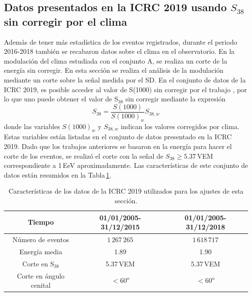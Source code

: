 \subsection{Datos presentados en la ICRC 2019 usando $S_{38}$ sin corregir por el clima} \label{sin_corregir_s38}

Además de tener más estadística de los eventos registrados, durante el periodo 2016-2018 también se recabaron datos sobre el clima en el observatorio. En la modulación del clima estudiada con el conjunto A, se  realiza un corte de la energía sin corregir. En esta sección se realiza el análisis de la modulación mediante un  corte sobre la señal medida por el SD. En el conjunto de datos de la ICRC 2019, es posible acceder al valor de S(1000) sin corregir por el trabajo \cite{aab2017impact}, por lo que uno puede obtener el valor de S$_{38}$ sin corregir mediante la expresión
\begin{equation}
    S_{38} = \frac{S(1000)}{S(1000)_w}S_{38,w}
    \label{eq:s38_w}
\end{equation}
donde las variables $S(1000)_w$ y $S_{38,w}$ indican los valores corregidos por clima. Estas variables están listadas en el conjunto de datos presentado en la ICRC 2019. Dado que los trabajos anteriores se basaron en la energía para hacer el corte de los eventos, se realizó el corte con la señal de $S_{38}\ge 5.37\,$VEM correspondiente a 1\,EeV aproximadamente. Las características de este conjunto de datos están resumidos en la Tabla\,\ref{tabla:caracteristicas_ICRC_2019_S38}.
        \begin{table}[H]
            \centering
            \begin{tabular}{c|c|c}
            {Tiempo}                & {01/01/2005-31/12/2015}   & {01/01/2005-31/12/2018 }\\ \hline 
            Número de eventos       &   $1\,267\,265$     	    &  $1\,618\,717$     		\\ \hline 
            Energía media           &  1.89        		 	    &  1.90        		\\ \hline 
            Corte en S$_{38}$ 	    &  5.37\,VEM   		 	    &  5.37\,VEM       	\\ \hline 
            Corte en ángulo cenital &  $<60^o$ 			 	 & $<60^o$\\ 
            \end{tabular}
            \caption{Características de los datos de la ICRC 2019 utilizados para los ajustes de esta sección.} \label{tabla:caracteristicas_ICRC_2019_S38}
        \end{table}
        
